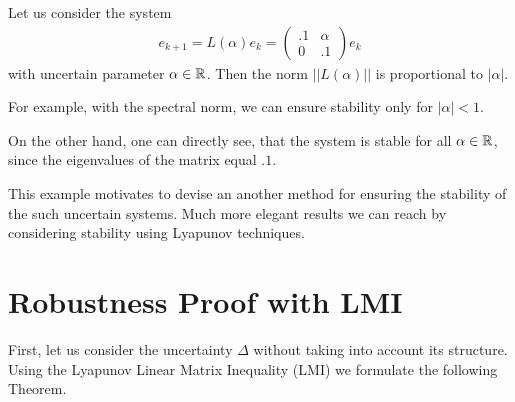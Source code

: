 \begin{exam}
	\label{exp:rob:bad_example}
Let us consider the system 
\begin{align}
e_{k+1}  = L(\alpha) e_k = \begin{pmatrix}
.1 & \alpha \\ 0 & .1
\end{pmatrix}e_k
\end{align}
with uncertain parameter $\alpha \in {\mathbb{R}}$.
Then the norm $||L(\alpha)||$ is proportional to $|\alpha|$.

For example, with the spectral norm, we can ensure stability only for $|\alpha|<1$. 


On the other hand, one can directly see, that the system is stable for all $\alpha \in {\mathbb{R}}$, since the eigenvalues of the matrix equal $.1$. 	
\end{exam}

This example motivates to devise an another method for ensuring the stability of the such uncertain systems. 
Much more elegant results we can reach by considering stability using Lyapunov techniques. 

 

\section{Robustness Proof with LMI}

First, let us consider the uncertainty $\Delta$ without taking into account its structure. 
Using the Lyapunov Linear Matrix Inequality (LMI) we formulate the following Theorem. 

